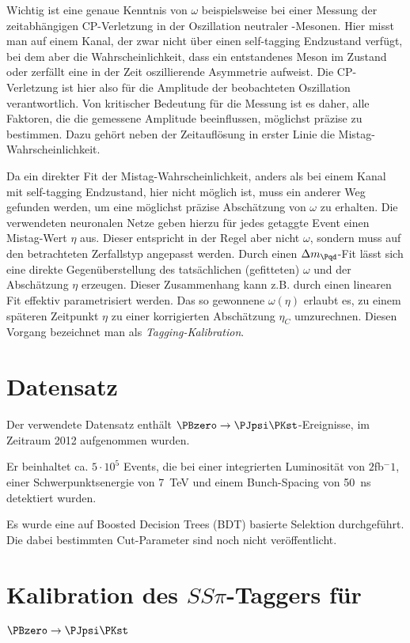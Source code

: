 Wichtig ist eine genaue Kenntnis von $ω$ beispielsweise bei einer Messung der zeitabhängigen CP-Verletzung in der Oszillation neutraler \PB-Mesonen.
Hier misst man auf einem Kanal, der zwar nicht über einen self-tagging Endzustand verfügt, bei dem aber die Wahrscheinlichkeit, dass ein entstandenes Meson im Zustand \PBz oder \PaBz zerfällt eine in der Zeit oszillierende Asymmetrie aufweist.
Die CP-Verletzung ist hier also für die Amplitude der beobachteten Oszillation verantwortlich.
Von kritischer Bedeutung für die Messung ist es daher, alle Faktoren, die die gemessene Amplitude beeinflussen, möglichst präzise zu bestimmen.
Dazu gehört neben der Zeitauflösung in erster Linie die Mistag-Wahrscheinlichkeit.

Da ein direkter Fit der Mistag-Wahrscheinlichkeit, anders als bei einem Kanal mit self-tagging Endzustand, hier nicht möglich ist, muss ein anderer Weg gefunden werden, um eine möglichst präzise Abschätzung von $ω$ zu erhalten.
Die verwendeten neuronalen Netze geben hierzu für jedes getaggte Event einen Mistag-Wert $η$ aus.
Dieser entspricht in der Regel aber nicht $ω$, sondern muss auf den betrachteten Zerfallstyp angepasst werden.
Durch einen $\difference{m_{\Pqd}}$-Fit lässt sich eine direkte Gegenüberstellung des tatsächlichen (gefitteten) $ω$ und der Abschätzung $η$ erzeugen.
Dieser Zusammenhang kann z.B. durch einen linearen Fit effektiv parametrisiert werden.
Das so gewonnene $ω(η)$ erlaubt es, zu einem späteren Zeitpunkt $η$ zu einer korrigierten Abschätzung $η_C$ umzurechnen.
Diesen Vorgang bezeichnet man als \emph{Tagging-Kalibration}.

\section{Datensatz}
\label{datensatz}

Der verwendete Datensatz enthält $\PBzero \to \PJpsi\PKst$-Ereignisse, im Zeitraum 2012 aufgenommen wurden.

Er beinhaltet ca. $5\cdot10^5$ Events, die bei einer integrierten Luminosität von $2$\:fb$^-1$, einer Schwerpunktsenergie von \SI{7}{\tera\electronvolt} und einem Bunch-Spacing von \SI{50}{\nano\second} detektiert wurden.

Es wurde eine auf Boosted Decision Trees (BDT) basierte Selektion durchgeführt.
Die dabei bestimmten Cut-Parameter sind noch nicht veröffentlicht.

\section{\texorpdfstring{Kalibration des $SS\pi$-Taggers für $\PBzero \to \PJpsi \PKst$}{Kalibration des SSpi-Taggers für B0 -> JpsiKst}}

